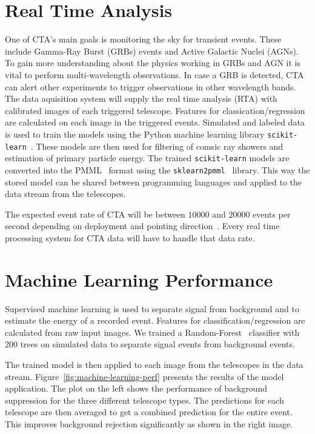 \documentclass[11pt,twoside]{article}
\begin{document}
\section{Real Time Analysis}

One of CTA's main goals is monitoring the sky for transient events.
These include Gamma-Ray Burst (GRBs) events and Active Galactic Nuclei (AGNs).
To gain more understanding about the physics working in GRBs and AGN it is vital to perform multi-wavelength observations.
In case a GRB is detected,  CTA can alert other experiments to trigger observations in other wavelength bands.
The data aquisition system will supply the real time analysis (RTA) with calibrated images of each triggered telescope.
Features for classication/regression are calculated on each image in the triggered events.
Simulated and labeled data is used to train the models using the Python machine learning library \texttt{scikit-learn}~\citep{sklearn}.
These models are then used for filtering of comsic ray showers and estimation of primary particle energy.
The trained \texttt{scikit-learn} models are converted into the PMML~\citep{pmml} format using the \texttt{sklearn2pmml}~\citep{sklearn2pmml} library.
This way the stored model can be shared between programming languages and applied to the data stream from the telescopes.

The expected event rate of CTA will be between $10000$ and $20000$ events per second depending on deployment
and pointing direction~\citep{trigger}. Every real time processing system for CTA data will have to handle that data rate.




\section{Machine Learning Performance}

Supervised machine learning is used to separate signal from background and to estimate the energy of a recorded event.
Features for classification/regression are calculated from raw input images.
We trained a Random-Forest~\citep{rf} classifier with 200 trees on simulated data to separate signal events from background events.

The trained model is then applied to each image from the telescopes in the data stream.
Figure~\ref{fig:machine-learning-perf} presents the results of the model application.
The plot on the left shows the performance of background suppression for the three different telescope types.
The predictions for each telescope are then averaged to get a combined prediction for the entire event.
This improves background rejection significantly as shown in the right image.
\end{document}
